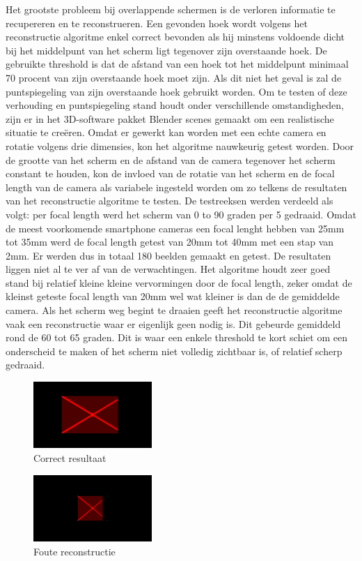Het grootste probleem bij overlappende schermen is de verloren informatie te recupereren en te reconstrueren. Een gevonden hoek wordt volgens het reconstructie algoritme enkel correct bevonden als hij minstens voldoende dicht bij het middelpunt van het scherm ligt tegenover zijn overstaande hoek. De gebruikte threshold is dat de afstand van een hoek tot het middelpunt minimaal 70 procent van zijn overstaande hoek moet zijn. Als dit niet het geval is zal de puntspiegeling van zijn overstaande hoek gebruikt worden.
Om te testen of deze verhouding en puntspiegeling stand houdt onder verschillende omstandigheden, zijn er in het 3D-software pakket Blender scenes gemaakt om een realistische situatie te creëren. Omdat er gewerkt kan worden met een echte camera en rotatie volgens drie dimensies, kon het algoritme nauwkeurig getest worden. Door de grootte van het scherm en de afstand van de camera tegenover het scherm constant te houden, kon de invloed van de rotatie van het scherm en de focal length van de camera als variabele ingesteld worden om zo telkens de resultaten van het reconstructie algoritme te testen. De testreeksen werden verdeeld als volgt: per focal length werd het scherm van 0 to 90 graden per 5 gedraaid. Omdat de meest voorkomende smartphone cameras een focal lenght hebben van 25mm tot 35mm werd de focal length getest van 20mm tot 40mm met een stap van 2mm. Er werden dus in totaal 180 beelden gemaakt en getest.
De resultaten liggen niet al te ver af van de verwachtingen. Het algoritme houdt zeer goed stand bij relatief kleine kleine vervormingen door de focal length, zeker omdat de kleinst geteste focal length van 20mm wel wat kleiner is dan de de gemiddelde camera. Als het scherm weg begint te draaien geeft het reconstructie algoritme vaak een reconstructie waar er eigenlijk geen nodig is. Dit gebeurde gemiddeld rond de 60 tot 65 graden. Dit is waar een enkele threshold te kort schiet om een onderscheid te maken of het scherm niet volledig zichtbaar is, of relatief scherp gedraaid.

\begin{figure}

	\center
	\includegraphics[width=0.4\textwidth]{correct-resultaat}
	\caption{Correct resultaat}
	\label{corr}
\end{figure}

\begin{figure}

	\center
	\includegraphics[width=0.4\textwidth]{fout-resultaat}
	\caption{Foute reconstructie}
	\label{fout}
\end{figure}